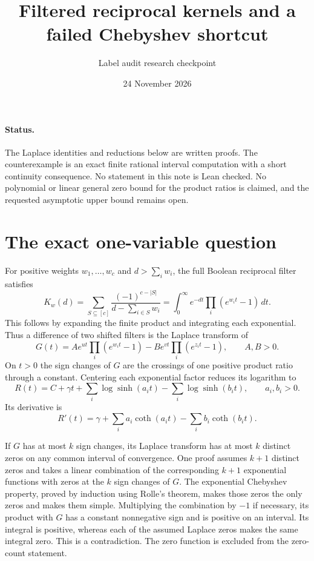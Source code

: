 \documentclass[11pt]{article}
\title{Filtered reciprocal kernels and a failed Chebyshev shortcut}
\date{24 November 2026}
\author{Label audit research checkpoint}
\begin{document}
\maketitle

\paragraph{Status.}
The Laplace identities and reductions below are written proofs. The
counterexample is an exact finite rational interval computation with a
short continuity consequence. No statement in this note is Lean checked.
No polynomial or linear general zero bound for the product ratios is
claimed, and the requested asymptotic upper bound remains open.

\section{The exact one-variable question}

For positive weights $w_1,\ldots,w_c$ and $d>\sum_iw_i$, the full Boolean
reciprocal filter satisfies
\[
 K_w(d)=\sum_{S\subseteq[c]}\frac{(-1)^{c-|S|}}{d-\sum_{i\in S}w_i}
       =\int_0^\infty e^{-dt}\prod_i(e^{w_it}-1)\,dt.
\]
This follows by expanding the finite product and integrating each
exponential. Thus a difference of two shifted filters is the Laplace
transform of
\[
 G(t)=A e^{ut}\prod_i(e^{w_it}-1)
      -B e^{vt}\prod_i(e^{z_it}-1),\qquad A,B>0.
\]
On $t>0$ the sign changes of $G$ are the crossings of one positive
product ratio through a constant. Centering each exponential factor
reduces its logarithm to
\[
 R(t)=C+\gamma t+\sum_i\log\sinh(a_it)
                         -\sum_i\log\sinh(b_it),
 \qquad a_i,b_i>0.
\]
Its derivative is
\[
 R'(t)=\gamma+\sum_i a_i\coth(a_it)-\sum_i b_i\coth(b_it).
\]

If $G$ has at most $k$ sign changes, its Laplace transform has at most
$k$ distinct zeros on any common interval of convergence. One proof
assumes $k+1$ distinct zeros and takes a linear combination of the
corresponding $k+1$ exponential functions with zeros at the $k$ sign
changes of $G$. The exponential Chebyshev property, proved by induction
using Rolle's theorem, makes those zeros the only zeros and makes them
simple. Multiplying the combination by $-1$ if necessary, its product
with $G$ has a constant nonnegative sign and is positive on an interval.
Its integral is positive, whereas each of the assumed Laplace zeros
makes the same integral zero. This is a contradiction. The zero function
is excluded from the zero-count statement.
\end{document}
